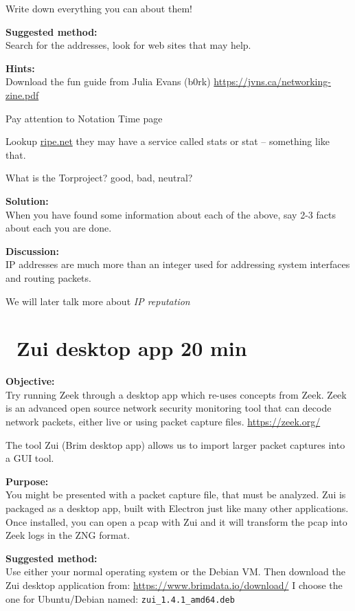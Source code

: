 \documentclass[a4paper,11pt,notitlepage]{report}
\begin{document}
Write down everything you can about them!

{\bf Suggested method:}\\
Search for the addresses, look for web sites that may help.

{\bf Hints:}\\
Download the fun guide from Julia Evans (b0rk) \url{https://jvns.ca/networking-zine.pdf}

Pay attention to Notation Time page

Lookup \url{ripe.net} they may have a service called stats or stat -- something like that.

What is the Torproject? good, bad, neutral?

{\bf Solution:}\\
When you have found some information about each of the above, say 2-3 facts about each you are done.

{\bf Discussion:}\\
IP addresses are much more than an integer used for addressing system interfaces and routing packets.

We will later talk more about \emph{IP reputation}


\chapter{\faInfoCircle\ Zui desktop app 20 min}
\label{ex:brim-security}


{\bf Objective:}\\
Try running Zeek through a desktop app which re-uses concepts from Zeek. Zeek is an advanced open source network security monitoring tool that can decode network packets, either live or using packet capture files. \url{https://zeek.org/}

The tool Zui (Brim desktop app) allows us to import larger packet captures into a GUI tool.

{\bf Purpose:}\\
You might be presented with a packet capture file, that must be analyzed. Zui is packaged as a desktop app, built with Electron just like many other applications. Once installed, you can open a pcap with Zui and it will transform the pcap into Zeek logs in the ZNG format.

{\bf Suggested method:}\\
Use either your normal operating system or the Debian VM. Then download the Zui desktop application from:
\url{https://www.brimdata.io/download/} I choose the one for Ubuntu/Debian named: \verb+zui_1.4.1_amd64.deb+
\end{document}
